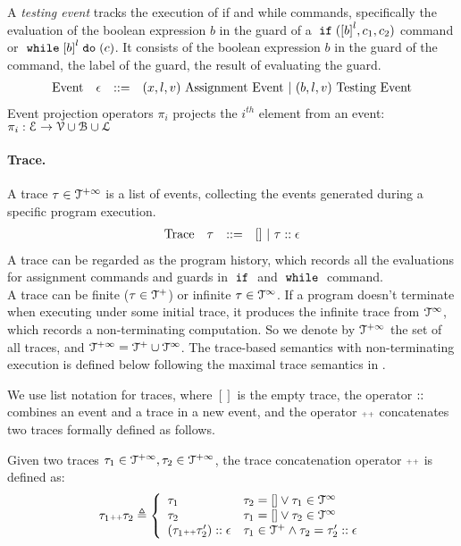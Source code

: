  A \emph{testing event} tracks the execution of if and while commands, specifically the evaluation of the boolean expression $b$ in the guard of a $\eif(\clabel{b}^l, c_1, c_2)$ command or $\ewhile \clabel{b}^l \edo (c)$.
 It consists of the boolean expression $b$ in the guard of the command, the label of the guard, the result of evaluating the guard.
%
\[
\begin{array}{llll}
  \mbox{Event} 
  & \mathtt{\epsilon} & ::= & 
  ({x}, l, v) ~ \mbox{Assignment Event} 
  ~|~(b, l, v) ~ \mbox{Testing Event}
\end{array}
\]
Event projection operators $\pi_i$ projects the $i^{th}$ element from an event: 
$\pi_i : \mathcal{E} \to \mathcal{V} \cup \mathcal{B} \cup \mathcal{L} $

\paragraph{Trace.}
%
A trace $\mathtt{\tau} \in \mathcal{T}^{+\infty}$ is a list of events, 
collecting the events generated during a specific program execution. 
\[
\begin{array}{llll}
\mbox{Trace} & \mathtt{\tau}
& ::= & [] ~|~ \mathtt{\tau} :: \mathtt{\epsilon} 
\end{array}
\]
A trace can be regarded as the program history, 
which records all the evaluations for assignment commands and guards in $\;\mathtt{if}\;$ and $\;\mathtt{while}\;$ command.
\\
{
A trace can be finite ($\mathtt{\tau} \in \mathcal{T}^{+}$) or infinite $\mathtt{\tau} \in \mathcal{T}^{\infty}$.
If a program doesn't terminate when executing under some initial trace,
it produces the infinite trace 
from $\mathcal{T}^{\infty}$, which records a non-terminating computation.
So we denote by $\mathcal{T}^{+\infty}$ the set of all traces, and $\mathcal{T}^{+\infty} = \mathcal{T}^{+} \cup \mathcal{T}^{\infty}$.
The trace-based semantics with non-terminating execution is defined below following the maximal trace semantics in \cite{Cousot19}.}

We use list notation for traces, where $[]$ is the empty trace, the operator ${\small ::}$ combines an event and a trace in a new event, 
and the operator ${\scriptscriptstyle ++}$ concatenates two traces formally defined as follows. 
\begin{defn}
  \label{def:trace_concate}
Given two traces $\mathtt{\tau}_1 \in \mathcal{T}^{+\infty}, \mathtt{\tau}_2 \in \mathcal{T}^{+\infty}$, the trace concatenation operator 
${\scriptscriptstyle ++}$ is defined as:
\[
\trace_1 \tracecat \trace_2 \triangleq
\left\{
\begin{array}{ll} 
  \trace_1 & \trace_2 = [] \lor \trace_1 \in \inftdom \\
  \trace_2 & \trace_1 = [] \lor \trace_2 \in \inftdom \\
  (\trace_1   \tracecat \trace_2'):: \event & \trace_1 \in \ftdom \land \trace_2 = \trace_2' :: \event
\end{array}
\right.
\]
\end{defn}


